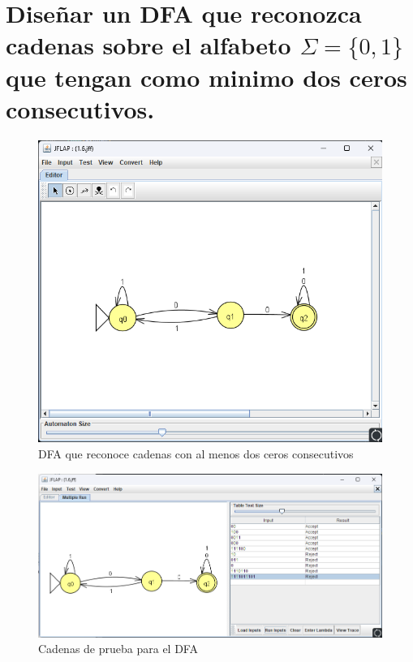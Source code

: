 \documentclass[11pt]{report}
\begin{document}
\newpage

\section{Diseñar un DFA que reconozca cadenas sobre el alfabeto $\Sigma = \{0, 1\}$ que tengan como minimo dos ceros consecutivos.}
\begin{figure}[H]
  \centering
  \includegraphics[scale=0.6]{img/DFA_06.png}
  \caption{DFA que reconoce cadenas con al menos dos ceros consecutivos}
\end{figure}

\begin{figure}[H]
  \centering
  \includegraphics[scale=0.65]{img/DFA_06_test.png}
  \caption{Cadenas de prueba para el DFA}
\end{figure}

\newpage
\end{document}
